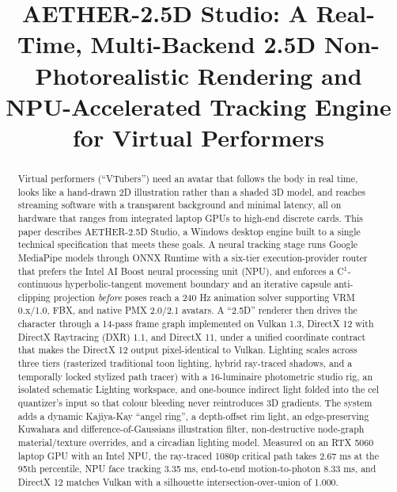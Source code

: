 \documentclass[conference]{IEEEtran}
\begin{document}
\title{AETHER-2.5D Studio: A Real-Time, Multi-Backend 2.5D Non-Photorealistic Rendering and NPU-Accelerated Tracking Engine for Virtual Performers}
\author{
}
\maketitle

\begin{abstract}
Virtual performers (``VTubers'') need an avatar that follows the body in real time, looks like a hand-drawn 2D illustration rather than a shaded 3D model, and reaches streaming software with a transparent background and minimal latency, all on hardware that ranges from integrated laptop GPUs to high-end discrete cards. This paper describes AETHER-2.5D Studio, a Windows desktop engine built to a single technical specification that meets these goals. A neural tracking stage runs Google MediaPipe models through ONNX Runtime with a six-tier execution-provider router that prefers the Intel AI Boost neural processing unit (NPU), and enforces a C$^1$-continuous hyperbolic-tangent movement boundary and an iterative capsule anti-clipping projection \textit{before} poses reach a 240 Hz animation solver supporting VRM 0.x/1.0, FBX, and native PMX 2.0/2.1 avatars. A ``2.5D'' renderer then drives the character through a 14-pass frame graph implemented on Vulkan 1.3, DirectX 12 with DirectX Raytracing (DXR) 1.1, and DirectX 11, under a unified coordinate contract that makes the DirectX 12 output pixel-identical to Vulkan. Lighting scales across three tiers (rasterized traditional toon lighting, hybrid ray-traced shadows, and a temporally locked stylized path tracer) with a 16-luminaire photometric studio rig, an isolated schematic Lighting workspace, and one-bounce indirect light folded into the cel quantizer's input so that colour bleeding never reintroduces 3D gradients. The system adds a dynamic Kajiya-Kay ``angel ring'', a depth-offset rim light, an edge-preserving Kuwahara and difference-of-Gaussians illustration filter, non-destructive node-graph material/texture overrides, and a circadian lighting model. Measured on an RTX 5060 laptop GPU with an Intel NPU, the ray-traced 1080p critical path takes 2.67 ms at the 95th percentile, NPU face tracking 3.35 ms, end-to-end motion-to-photon 8.33 ms, and DirectX 12 matches Vulkan with a silhouette intersection-over-union of 1.000.
\end{abstract}
\end{document}
